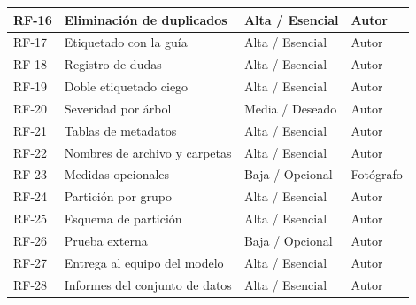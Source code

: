 \documentclass[11pt]{article}
\begin{document}
{\begin{longtable}{|>{\RaggedRight\arraybackslash}p{2.27cm}|>{\RaggedRight\arraybackslash}p{6.05cm}|>{\RaggedRight\arraybackslash}p{3.02cm}|>{\RaggedRight\arraybackslash}p{3.02cm}|}
RF-16 & Eliminación de duplicados & Alta / Esencial & Autor \\ \hline
RF-17 & Etiquetado con la guía & Alta / Esencial & Autor \\ \hline
RF-18 & Registro de dudas & Alta / Esencial & Autor \\ \hline
RF-19 & Doble etiquetado ciego & Alta / Esencial & Autor \\ \hline
RF-20 & Severidad por árbol & Media / Deseado & Autor \\ \hline
RF-21 & Tablas de metadatos & Alta / Esencial & Autor \\ \hline
RF-22 & Nombres de archivo y carpetas & Alta / Esencial & Autor \\ \hline
RF-23 & Medidas opcionales & Baja / Opcional & Fotógrafo \\ \hline
RF-24 & Partición por grupo & Alta / Esencial & Autor \\ \hline
RF-25 & Esquema de partición & Alta / Esencial & Autor \\ \hline
RF-26 & Prueba externa & Baja / Opcional & Autor \\ \hline
RF-27 & Entrega al equipo del modelo & Alta / Esencial & Autor \\ \hline
RF-28 & Informes del conjunto de datos & Alta / Esencial & Autor \\ \hline
\end{longtable}}
\end{document}

